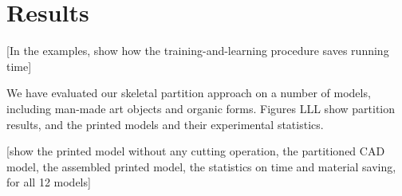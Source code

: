 \section{Results}
[In the examples, show how the training-and-learning procedure saves running time]

We have evaluated our skeletal partition approach on a number of models, including man-made art objects and organic forms. Figures LLL show partition results, and the printed models and their experimental statistics.




[show the printed model without any cutting operation, the partitioned CAD model, the assembled printed model, the statistics on time and material saving, for all 12 models]

